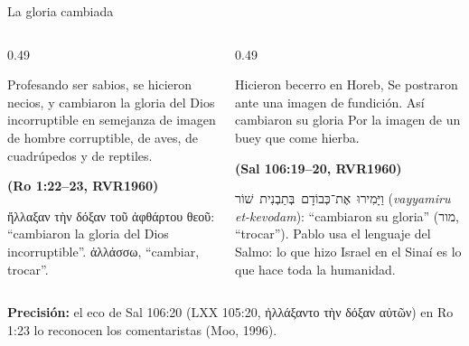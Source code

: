 \documentclass[hyperref={bookmarks=false},aspectratio=169]{beamer}
\newcommand{\heb}[1]{\mbox{\foreignlanguage{hebrew}{#1}}}
\newcommand{\grc}[1]{\foreignlanguage{ancientgreek}{#1}}
\newcommand{\fuente}[1]{\par\hfill{\upshape\bfseries\footnotesize\textcolor{azul}{#1}}}
\newcommand{\precision}[1]{{\footnotesize\color{gris}\textbf{Precisión:} #1}}
\begin{document}
\begin{frame}{La gloria cambiada}
\begin{columns}[t,onlytextwidth]
\begin{column}{0.49\textwidth}
\begin{cita}Profesando ser sabios, se hicieron necios, y cambiaron la gloria del Dios incorruptible en semejanza de imagen de hombre corruptible, de aves, de cuadrúpedos y de reptiles.\fuente{(Ro 1:22--23, RVR1960)}\end{cita}
\scriptsize\grc{ἤλλαξαν τὴν δόξαν τοῦ ἀφθάρτου θεοῦ}: ``cambiaron la gloria del Dios incorruptible''. \grc{ἀλλάσσω}, ``cambiar, trocar''.
\end{column}
\begin{column}{0.49\textwidth}
\begin{cita}Hicieron becerro en Horeb, Se postraron ante una imagen de fundición. Así cambiaron su gloria Por la imagen de un buey que come hierba.\fuente{(Sal 106:19--20, RVR1960)}\end{cita}
\scriptsize\heb{וַיָּמִירוּ אֶת־כְּבוֹדָם בְּתַבְנִית שׁוֹר} (\emph{vayyamiru et-kevodam}): ``cambiaron su gloria'' (\heb{מור}, ``trocar''). Pablo usa el lenguaje del Salmo: lo que hizo Israel en el Sinaí es lo que hace toda la humanidad.
\end{column}
\end{columns}
\precision{el eco de Sal 106:20 (LXX 105:20, \grc{ἠλλάξαντο τὴν δόξαν αὐτῶν}) en Ro 1:23 lo reconocen los comentaristas (Moo, 1996).}
\end{frame}
\end{document}
